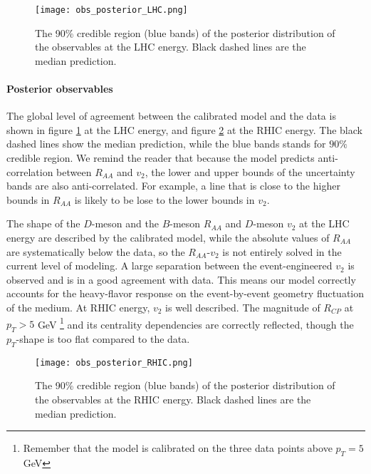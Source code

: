 \begin{figure}
\singlespacing
\centering
\texttt{[image: obs\_posterior\_LHC.png]}
\caption[The 90\% credible region (blue bands) of the posterior distribution]{The 90\% credible region (blue bands) of the posterior distribution of the observables at the LHC energy. Black dashed lines are the median prediction.}
\label{fig:new:obs_posterior_LHC}
\end{figure}

\paragraph{Posterior observables} The global level of agreement between the calibrated model and the data is shown in figure \ref{fig:new:obs_posterior_LHC} at the LHC energy, and figure \ref{fig:new:obs_posterior_RHIC} at the RHIC energy.
The black dashed lines show the median prediction, while the blue bands stands for $90\%$ credible region.
We remind the reader that because the model predicts anti-correlation between $R_{AA}$ and $v_2$, the lower and upper bounds of the uncertainty bands are also anti-correlated.
For example, a line that is close to the higher bounds in $R_{AA}$ is likely to be lose to the lower bounds in $v_2$.

The shape of the $D$-meson and the $B$-meson $R_{AA}$ and $D$-meson $v_2$ at the LHC energy are described by the calibrated model, while the absolute values of $R_{AA}$ are systematically below the data, so the $R_{AA}$-$v_2$ is not entirely solved in the current level of modeling.
A large separation between the event-engineered $v_2$ is observed and is in a good agreement with data.
This means our model correctly accounts for the heavy-flavor response on the event-by-event geometry fluctuation of the medium.
At RHIC energy, $v_2$ is well described.  
The magnitude of $R_{CP}$ at $p_T> 5$ GeV \footnote{\singlespacing  Remember that the model is calibrated on the three data points above $p_T=5$ GeV} and its centrality dependencies are correctly reflected, though the $p_T$-shape is too flat compared to the data.

\begin{figure}
\singlespacing
\centering
\texttt{[image: obs\_posterior\_RHIC.png]}
\caption[The 90\% credible region (blue bands) of the posterior distribution]{The 90\% credible region (blue bands) of the posterior distribution of the observables at the RHIC energy. Black dashed lines are the median prediction.}
\label{fig:new:obs_posterior_RHIC}
\end{figure}


